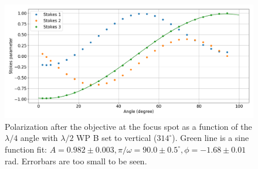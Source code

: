 \documentclass[english, a4paper, 12pt, twoside]{book}
\numberwithin{equation}{section} %
\begin{document}
\begin{appendices}
\begin{figure}[H]
\label{pol1}
\end{figure}
\begin{figure}[H]
\centering
\includegraphics[width = \textwidth]{pol2}
\caption{Polarization after the objective at the focus spot as a function of the $\lambda/4$ angle with $\lambda/2$ WP B set to vertical ($314^\circ$). Green line is a sine function fit: $A = 0.982 \pm 0.003,\pi/\omega = 90.0 \pm 0.5^\circ, \phi = -1.68\pm0.01$ rad. Errorbars are too small to be seen.}
\label{pol2}
\end{figure}
\end{appendices}
\end{document}
